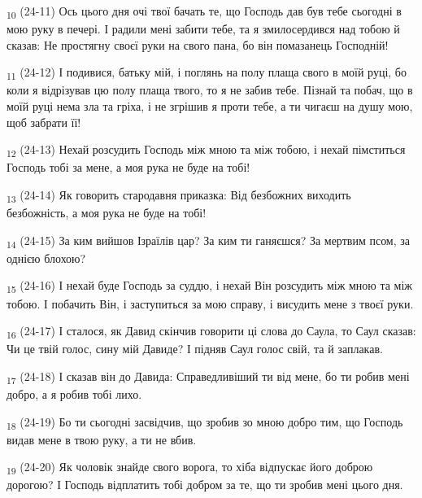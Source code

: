 \begin{tcolorbox}
\textsubscript{10} (24-11) Ось цього дня очі твої бачать те, що Господь дав був тебе сьогодні в мою руку в печері. І радили мені забити тебе, та я змилосердився над тобою й сказав: Не простягну своєї руки на свого пана, бо він помазанець Господній!
\end{tcolorbox}
\begin{tcolorbox}
\textsubscript{11} (24-12) І подивися, батьку мій, і поглянь на полу плаща свого в моїй руці, бо коли я відрізував цю полу плаща твого, то я не забив тебе. Пізнай та побач, що в моїй руці нема зла та гріха, і не згрішив я проти тебе, а ти чигаєш на душу мою, щоб забрати її!
\end{tcolorbox}
\begin{tcolorbox}
\textsubscript{12} (24-13) Нехай розсудить Господь між мною та між тобою, і нехай пімститься Господь тобі за мене, а моя рука не буде на тобі!
\end{tcolorbox}
\begin{tcolorbox}
\textsubscript{13} (24-14) Як говорить стародавня приказка: Від безбожних виходить безбожність, а моя рука не буде на тобі!
\end{tcolorbox}
\begin{tcolorbox}
\textsubscript{14} (24-15) За ким вийшов Ізраїлів цар? За ким ти ганяєшся? За мертвим псом, за однією блохою?
\end{tcolorbox}
\begin{tcolorbox}
\textsubscript{15} (24-16) І нехай буде Господь за суддю, і нехай Він розсудить між мною та між тобою. І побачить Він, і заступиться за мою справу, і висудить мене з твоєї руки.
\end{tcolorbox}
\begin{tcolorbox}
\textsubscript{16} (24-17) І сталося, як Давид скінчив говорити ці слова до Саула, то Саул сказав: Чи це твій голос, сину мій Давиде? І підняв Саул голос свій, та й заплакав.
\end{tcolorbox}
\begin{tcolorbox}
\textsubscript{17} (24-18) І сказав він до Давида: Справедливіший ти від мене, бо ти робив мені добро, а я робив тобі лихо.
\end{tcolorbox}
\begin{tcolorbox}
\textsubscript{18} (24-19) Бо ти сьогодні засвідчив, що зробив зо мною добро тим, що Господь видав мене в твою руку, а ти не вбив.
\end{tcolorbox}
\begin{tcolorbox}
\textsubscript{19} (24-20) Як чоловік знайде свого ворога, то хіба відпускає його доброю дорогою? І Господь відплатить тобі добром за те, що ти зробив мені цього дня.
\end{tcolorbox}
